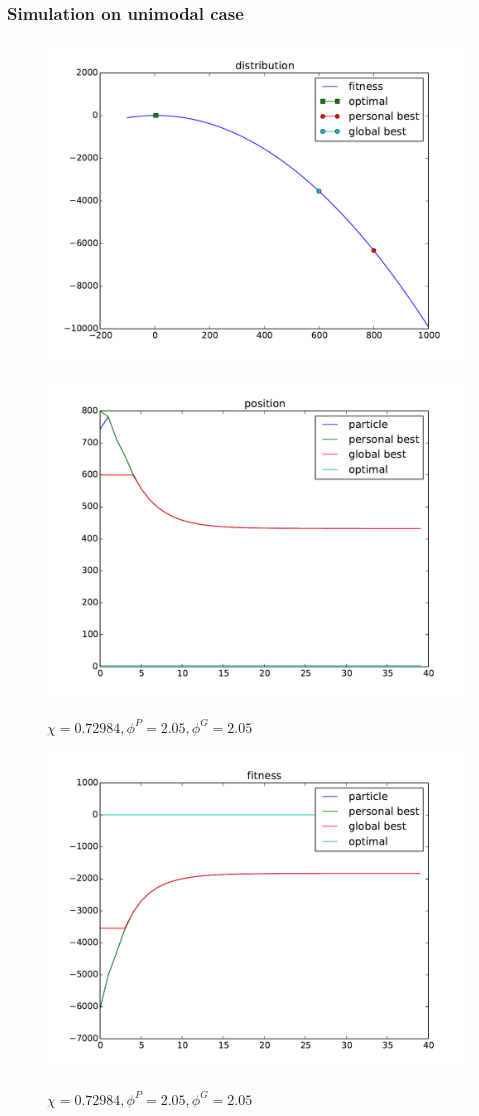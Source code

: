 \subsubsection{Simulation on unimodal case}

\begin{figure}[ht]
\centering
\includegraphics[width=.7\linewidth]{./simfig/case1/distribution1}
\label{fig:case1-1:distribution} 
\end{figure}

\begin{figure}[ht]
\centering
\includegraphics[width=.7\linewidth]{./simfig/case1/position1-1} 
\label{fig:case1-1:position}
\caption{$ \chi = 0.72984 , \phi^{P} = 2.05 , \phi^{G} = 2.05 $ }
\end{figure}

\begin{figure}[ht]
\centering
\includegraphics[width=.7\linewidth]{./simfig/case1/fitness1-1} 
\label{fig:case1-1:fitness}
\caption{$ \chi = 0.72984 , \phi^{P} = 2.05 , \phi^{G} = 2.05 $ }
\end{figure}

